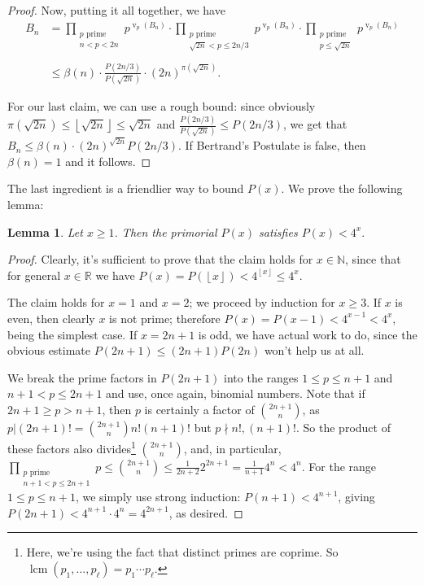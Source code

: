 \documentclass[11pt]{article}
\newtheorem{lemma}[theorem]{Lemma}
\theoremstyle{remark}
\newcommand{\floor}[1]{\left\lfloor #1 \right\rfloor}
\newcommand{\vs}{\vspace{10px}}
\DeclareMathOperator{\val}{v}
\DeclareMathOperator{\vv}{v}
\begin{document}
\begin{proof}
Now, putting it all together, we have 
    \begin{align*}
        B_n &= \prod\limits_{\substack{p\text{ prime }\\n<p<2n}}p^{\vv_p(B_n)}\cdot \prod\limits_{\substack{p\text{ prime }\\ \sqrt{2n}<p \le 2n/3}} p^{\val_p(B_n)}\cdot\prod_{\substack{p\text{ prime }\\p \le \sqrt{2n}}} p^{\val_p(B_n)}\\
        &\\
        &\le \beta(n)\cdot \frac{P(2n/3)}{P(\sqrt{2n})}\cdot  (2n)^{\pi(\sqrt{2n})}.
    \end{align*}
    
    For our last claim, we can use a rough bound: since obviously $\pi(\sqrt{2n})\le \floor{\sqrt{2n}}\le \sqrt{2n}$ and $ \frac{P(2n/3)}{P(\sqrt{2n})}\le P(2n/3)$, we get that $B_n \le \beta(n)\cdot (2n)^{\sqrt{2n}}P(2n/3)$. If Bertrand's Postulate is false, then $\beta(n)=1$ and it follows.
\end{proof}\vs


 The last ingredient is a friendlier way to bound $P(x)$. We prove the following lemma:
 
\begin{lemma} \label{lemma:bound_primorial}
    Let $x\ge 1$. Then the primorial $P(x)$ satisfies $P(x)< 4^{x}.$
\end{lemma}
\begin{proof}
    Clearly, it's sufficient to prove that the claim holds for $x\in\mathbb N$, since that for general $x\in \mathbb R$ we have  $P(x)=P(\floor x)< 4^{\floor x}\le 4^x$.

    The claim holds for $x =1$ and $x =2$; we proceed by induction for $x \ge 3$. If $x$ is even, then clearly $x$ is not prime; therefore $P(x) = P(x-1) < 4^{x-1}<4^x$, being the simplest case. If $x = 2n+1$ is odd, we have actual work to do, since the obvious estimate $P(2n+1)\le (2n+1)P(2n)$ won't help us at all.
    \vs
    
    We break the prime factors in $P(2n+1)$ into the ranges $1\le p\le n+1$ and $n+1< p\le 2n+1$ and use, once again, binomial numbers. Note that if $2n+1\ge p>n+1$, then $p$ is certainly a factor of $\binom{2n+1}{n}$, as $p|(2n+1)! = \binom{2n+1}{n}n!(n+1)!$ but $p\nmid n!, (n+1)!$. So the product of these factors also divides\footnote{Here, we're using the fact that distinct primes are coprime. So $\operatorname{lcm}(p_1,\ldots,p_\ell)=p_1\cdots p_\ell.$} $\binom{2n+1}{n}$, and, in particular, $\prod\limits_{\substack{p\text{ prime} \\ n+1<p\le 2n+1}}p\le \binom{2n+1}{n}\le \frac1{2n+2}2^{2n+1}=\frac1{n+1}4^n<4^n.$ For the range $1\le p\le n+1$, we simply use strong induction: $P(n+1)< 4^{n+1}$, giving $P(2n+1)< 4^{n+1}\cdot 4^n= 4^{2n+1}$, as desired.


\end{proof}
\vs
\end{document}
